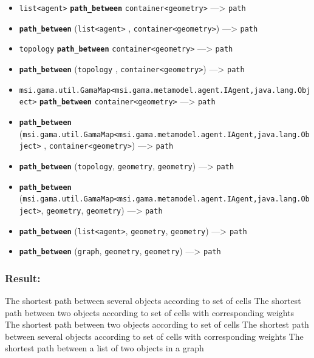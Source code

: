 \documentclass[]{book}
\providecommand{\tightlist}{%
  \setlength{\itemsep}{0pt}\setlength{\parskip}{0pt}}
\theoremstyle{definition}
\theoremstyle{definition}
\theoremstyle{definition}
\theoremstyle{remark}
\begin{document}
\begin{itemize}
\tightlist
\item
  \texttt{list\textless{}agent\textgreater{}}
  \textbf{\texttt{path\_between}}
  \texttt{container\textless{}geometry\textgreater{}} ---\textgreater{}
  \texttt{path}
\item
  \textbf{\texttt{path\_between}}
  (\texttt{list\textless{}agent\textgreater{}} ,
  \texttt{container\textless{}geometry\textgreater{}}) ---\textgreater{}
  \texttt{path}
\item
  \texttt{topology} \textbf{\texttt{path\_between}}
  \texttt{container\textless{}geometry\textgreater{}} ---\textgreater{}
  \texttt{path}
\item
  \textbf{\texttt{path\_between}} (\texttt{topology} ,
  \texttt{container\textless{}geometry\textgreater{}}) ---\textgreater{}
  \texttt{path}
\item
  \texttt{msi.gama.util.GamaMap\textless{}msi.gama.metamodel.agent.IAgent,java.lang.Object\textgreater{}}
  \textbf{\texttt{path\_between}}
  \texttt{container\textless{}geometry\textgreater{}} ---\textgreater{}
  \texttt{path}
\item
  \textbf{\texttt{path\_between}}
  (\texttt{msi.gama.util.GamaMap\textless{}msi.gama.metamodel.agent.IAgent,java.lang.Object\textgreater{}}
  , \texttt{container\textless{}geometry\textgreater{}})
  ---\textgreater{} \texttt{path}
\item
  \textbf{\texttt{path\_between}} (\texttt{topology}, \texttt{geometry},
  \texttt{geometry}) ---\textgreater{} \texttt{path}
\item
  \textbf{\texttt{path\_between}}
  (\texttt{msi.gama.util.GamaMap\textless{}msi.gama.metamodel.agent.IAgent,java.lang.Object\textgreater{}},
  \texttt{geometry}, \texttt{geometry}) ---\textgreater{} \texttt{path}
\item
  \textbf{\texttt{path\_between}}
  (\texttt{list\textless{}agent\textgreater{}}, \texttt{geometry},
  \texttt{geometry}) ---\textgreater{} \texttt{path}
\item
  \textbf{\texttt{path\_between}} (\texttt{graph}, \texttt{geometry},
  \texttt{geometry}) ---\textgreater{} \texttt{path}
\end{itemize}

\subsubsection{Result:}\label{result-381}

The shortest path between several objects according to set of cells The
shortest path between two objects according to set of cells with
corresponding weights The shortest path between two objects according to
set of cells The shortest path between several objects according to set
of cells with corresponding weights The shortest path between a list of
two objects in a graph
\end{document}
